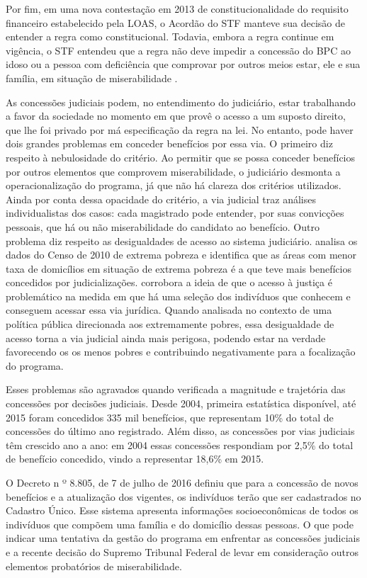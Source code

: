 \documentclass[
	12pt,				%
	openright,			%
	twoside,			%
	a4paper,			%
	english,			%
	french,				%
	spanish,			%
	brazil				%
	]{abntex2}
\begin{document}
Por fim, em uma nova contestação em 2013 de constitucionalidade do requisito financeiro estabelecido pela LOAS, o Acordão do STF manteve sua decisão de entender a regra como constitucional. Todavia, embora a regra continue em vigência, o STF entendeu que a regra não deve impedir a concessão do BPC ao idoso ou a pessoa com deficiência que comprovar por outros meios estar, ele e sua família, em situação de miserabilidade \cite{acordaoSTFBPC}.

As concessões judiciais podem, no entendimento do judiciário, estar trabalhando a favor da sociedade no momento em que provê o acesso a um suposto direito, que lhe foi privado por má especificação da regra na lei. No entanto, pode haver dois grandes problemas em conceder benefícios por essa via. O primeiro diz respeito à nebulosidade do critério. Ao permitir que se possa conceder benefícios por outros elementos que comprovem miserabilidade, o judiciário desmonta a operacionalização do programa, já que não há clareza dos critérios utilizados. Ainda por conta dessa opacidade do critério, a via judicial traz análises individualistas dos casos: cada magistrado pode entender, por suas convicções pessoais, que há ou não miserabilidade do candidato ao benefício. Outro problema diz respeito as desigualdades de acesso ao sistema judiciário.  analisa os dados do Censo de 2010 de extrema pobreza e identifica que as áreas com menor taxa de domicílios em situação de extrema pobreza é a que teve mais benefícios concedidos por judicializações.  corrobora a ideia de que o acesso à justiça é problemático na medida em que há uma seleção dos indivíduos que conhecem e conseguem acessar essa via jurídica. Quando analisada no contexto de uma política pública direcionada aos extremamente pobres, essa desigualdade de acesso torna a via judicial ainda mais perigosa, podendo estar na verdade favorecendo os os menos pobres e contribuindo negativamente para a focalização do programa.  

Esses problemas são agravados quando verificada a magnitude e trajetória das concessões por decisões judiciais. Desde 2004, primeira estatística disponível, até 2015 foram concedidos 335 mil benefícios, que representam 10\% do total de concessões do último ano registrado. Além disso, as concessões por vias judiciais têm crescido ano a ano: em 2004 essas concessões respondiam por 2,5\% do total de benefício concedido, vindo a representar 18,6\% em 2015.

O Decreto n º 8.805, de 7 de julho de 2016 definiu que para a concessão de novos benefícios e a atualização dos vigentes, os indivíduos terão que ser cadastrados no Cadastro Único. Esse sistema apresenta informações socioeconômicas de todos os indivíduos que compõem uma família e do domicílio dessas pessoas. O que pode indicar uma tentativa da gestão do programa em enfrentar as concessões judiciais e a recente decisão do Supremo Tribunal Federal de levar em consideração outros elementos probatórios de miserabilidade. 
\end{document}
